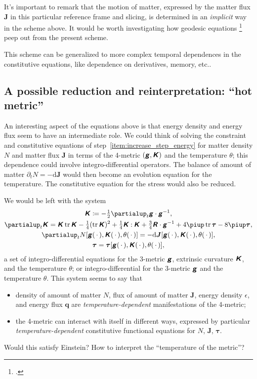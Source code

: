 \documentclass[\ifafour a4paper,12pt,\else a5paper,10pt,\fi%
onecolumn,oneside,article,%
british%
]{memoir}
\theoremstyle{remark}
\theoremstyle{innote}
\newcommand*{\mathte}[1]{\textbf{\textit{\textsf{#1}}}}
\newcommand*{\citep}{\footcites}
\newcommand*{\de}{\partialup}%
\newcommand*{\pu}{\piup}%
\newcommand*{\di}{\mathrm{d}}%
\DeclareMathOperator{\tr}{tr}%
\newcommand*{\defd}{\coloneqq}
\newcommand*{\dotv}{\mathord{\,\cdot\,}}%
\newcommand*{\con}{\mathbin{:}}%
\renewcommand*{\|}[1][]{\nonscript\,#1\vert\nonscript\;\mathopen{}}
\newcommand*{\etc}{{etc.}}
\newcommand*{\yd}{N}
\newcommand*{\yjj}{J}
\newcommand*{\yj}{\bm{\yjj}}
\newcommand*{\yTT}{\tau}
\newcommand*{\yT}{\bm{\yTT}}
\newcommand*{\ygg}{g}
\newcommand*{\yg}{\mathte{\ygg}}
\newcommand*{\yKK}{K}
\newcommand*{\yK}{\mathte{\yKK}}
\newcommand*{\yRR}{R}
\newcommand*{\yR}{\mathte{\yRR}}
\newcommand*{\ypp}{q}
\newcommand*{\yp}{\bm{\ypp}}
\newcommand*{\ye}{\epsilon}
\newcommand*{\yte}{\theta}
\begin{document}
It's important to remark that the motion of matter, expressed by the 
matter flux $\yj$ in this particular reference frame and slicing, is determined
in an \emph{implicit} way in the scheme above. It would be worth
investigating how geodesic equations \citep{gerochetal1975,weatherall2011}
peep out from the present scheme.

This scheme can be generalized to more complex temporal dependences in the
constitutive equations, like dependence on derivatives, memory, \etc.

\subsection{A possible reduction and reinterpretation: \enquote{hot metric}}
\label{sec:reinterpretation_metric_temp}

An interesting aspect of the equations above is that energy density and
energy flux seem to have an intermediate role. We could think of solving
the constraint and constitutive equations of
step~\ref{item:increase_step_energy} for matter density $\yd$ and matter
flux $\yj$ in terms of the 4-metric $(\yg, \yK)$ and the temperature
$\yte$; this dependence could involve integro-differential operators. The
balance of amount of matter $\de_t\yd = -\di\yj$ would then become an
evolution equation for the temperature. The constitutive equation for the
stress would also be reduced.

We would be left with the system
\begin{subequations}\label{eq:evolution_eqns_new}
  \begin{gather}
    \label{eq:dt_metric_new}
    \yK \defd -\tfrac{1}{2}\de_t \yg \cdot \yg^{-1},
    \\
    \label{eq:dt_curvat_new}
    \de_t \yK =  \yK\tr\yK
                - \tfrac{1}{4} (\tr\yK)^2
                +\tfrac{1}{4}\yK\con\yK
                + \tfrac{3}{4}\yR\cdot\yg^{-1} 
                + 4\pu\tr\yT - 8\pu\yT,
    \\
    \label{eq:constit_mass_new}
    \de_t \yd[\yg(\dotv),\yK(\dotv),\yte(\dotv)] = -\di\yj[\yg(\dotv),\yK(\dotv),\yte(\dotv)],
    \\
    \label{eq:constit_T_new}
    \yT = \yT[\yg(\dotv),\yK(\dotv),\yte(\dotv)],
  \end{gather}
\end{subequations}
a set of integro-differential equations for the 3-metric $\yg$,
extrinsic curvature $\yK$, and the temperature $\yte$; or integro-differential for
the 3-metric $\yg$ and the temperature $\yte$. This system seems to say
that
\begin{itemize}
\item density of amount of matter $\yd$, flux of amount of matter $\yj$,
  energy density $\ye$, and energy flux $\yp$ are
  \emph{temperature-dependent} manifestations of the 4-metric;
\item the 4-metric can interact with itself in different ways, expressed by
  particular \emph{temperature-dependent} constitutive functional equations
  for $\yd$, $\yj$, $\yT$.
\end{itemize}
Would this satisfy Einstein? How to interpret the \enquote{temperature of
  the metric}?
\end{document}
